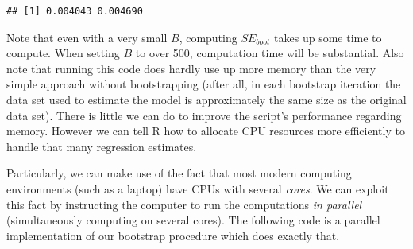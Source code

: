\documentclass[
  12pt,
]{style/krantz}
\begin{document}
\begin{verbatim}
## [1] 0.004043 0.004690
\end{verbatim}

Note that even with a very small \(B\), computing \(SE_{boot}\) takes up some time to compute. When setting \(B\) to over 500, computation time will be substantial. Also note that running this code does hardly use up more memory than the very simple approach without bootstrapping (after all, in each bootstrap iteration the data set used to estimate the model is approximately the same size as the original data set). There is little we can do to improve the script's performance regarding memory. However we can tell R how to allocate CPU resources more efficiently to handle that many regression estimates.

Particularly, we can make use of the fact that most modern computing environments (such as a laptop) have CPUs with several \emph{cores}. We can exploit this fact by instructing the computer to run the computations \emph{in parallel} (simultaneously computing on several cores). The following code is a parallel implementation of our bootstrap procedure which does exactly that.
\end{document}
